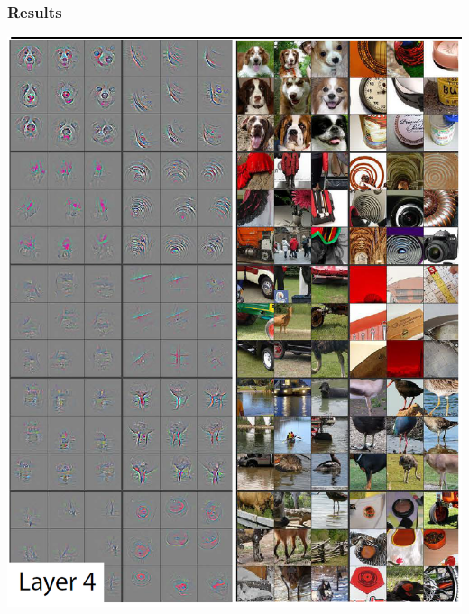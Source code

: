 \begin{frame}
	\frametitle{Results}

	\begin{center}
		\includegraphics[scale=0.5]{figs/ZFnet_layer4}
	\end{center}
\end{frame}

